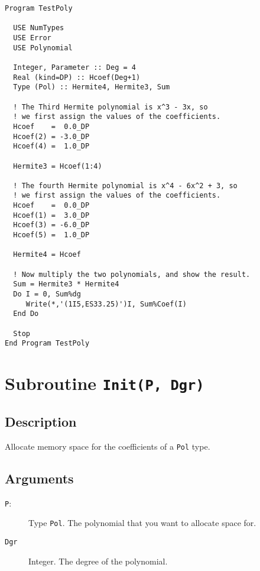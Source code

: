 \begin{lstlisting}[emph=Type,
                   emphstyle=\color{blue},
                   frame=trBL,
                   caption=Computing the product of two polynomials.,
                   label=prodpol]
Program TestPoly

  USE NumTypes
  USE Error
  USE Polynomial

  Integer, Parameter :: Deg = 4
  Real (kind=DP) :: Hcoef(Deg+1)
  Type (Pol) :: Hermite4, Hermite3, Sum

  ! The Third Hermite polynomial is x^3 - 3x, so
  ! we first assign the values of the coefficients.
  Hcoef    =  0.0_DP
  Hcoef(2) = -3.0_DP
  Hcoef(4) =  1.0_DP

  Hermite3 = Hcoef(1:4)

  ! The fourth Hermite polynomial is x^4 - 6x^2 + 3, so
  ! we first assign the values of the coefficients.
  Hcoef    =  0.0_DP
  Hcoef(1) =  3.0_DP
  Hcoef(3) = -6.0_DP
  Hcoef(5) =  1.0_DP

  Hermite4 = Hcoef

  ! Now multiply the two polynomials, and show the result.
  Sum = Hermite3 * Hermite4
  Do I = 0, Sum%dg
     Write(*,'(1I5,ES33.25)')I, Sum%Coef(I)
  End Do

  Stop
End Program TestPoly
\end{lstlisting}


\section{Subroutine \texttt{Init(P, Dgr)}}

\subsection{Description}

Allocate memory space for the coefficients of a \texttt{Pol} type.

\subsection{Arguments}

\begin{description}
\item[\texttt{P}:] Type \texttt{Pol}. The polynomial that you want
  to allocate space for.
\item[\texttt{Dgr}] Integer. The degree of the polynomial.
\end{description}


